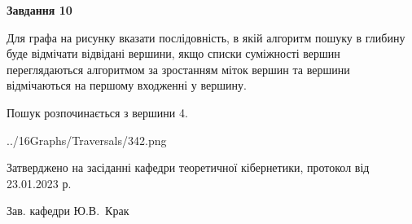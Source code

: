 \documentclass[12pt, ukrainian]{article}
\begin{document}
{\begin {large}
{\begin {center}\textbf{Завдання 10}\end {center}}\par
Для графа на рисунку вказати послідовність, в якій алгоритм пошуку в глибину буде відмічати відвідані вершини, якщо списки суміжності вершин переглядаються алгоритмом за зростанням міток вершин та вершини відмічаються на першому вход\-женні у вершину.\par
Пошук розпочинається з вершини 4.\par

\begin{center}
	{../16Graphs/Traversals/342.png}
\end{center}\par
\newpage


\end {large}
}
{\smallskip \begin {small} Затверджено на засіданні кафедри теоретичної кібернетики, протокол  від   23.01.2023 р.\par\smallskip\smallskip
{\parbox {6.5 cm}{Зав. кафедри \dotfill Ю.В.~Крак}} \end{small}}
\end{document}
